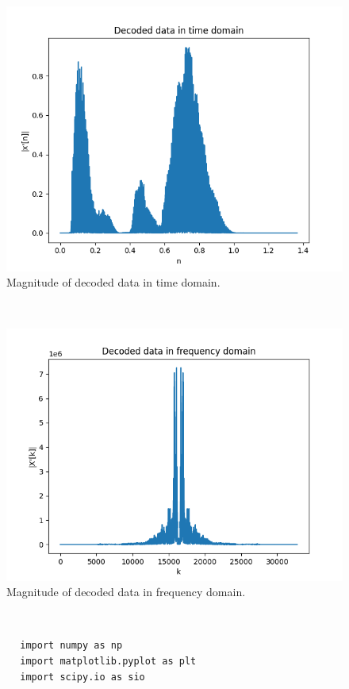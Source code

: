 \documentclass[10pt,a4paper, margin=1in]{article}
\begin{document}
\begin{enumerate}
          \begin{figure}[H]
            \includegraphics[scale = 0.75]{d_t}
            \caption{Magnitude of decoded data in time domain.}
          \end{figure}~\\
          \begin{figure}[H]
            \includegraphics[scale = 0.75]{d_f}
            \caption{Magnitude of decoded data in frequency domain.}
          \end{figure}~\\
          \lstset{language=Python}
    \lstset{frame=single}
    \lstset{basicstyle=\footnotesize}
    \begin{lstlisting}
        import numpy as np
        import matplotlib.pyplot as plt
        import scipy.io as sio
        

\end{lstlisting}
\end{enumerate}
\end{document}
